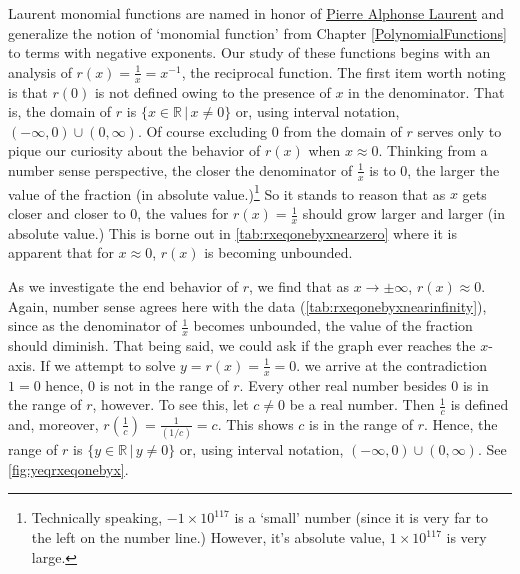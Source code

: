 Laurent monomial functions are named in honor of \href{https://en.wikipedia.org/wiki/Pierre_Alphonse_Laurent}{\underline{Pierre Alphonse Laurent}} and generalize the notion of `monomial function' from Chapter \ref{PolynomialFunctions} to terms with negative exponents. Our study of these functions begins with an analysis of   $r(x) = \frac{1}{x} = x^{-1}$, the reciprocal function. The first item worth  noting is that $r(0)$ is not defined owing to the presence of $x$  in the denominator.  That is, the domain of $r$ is $\{ x \in \mathbb{R} \, | \, x \neq 0\}$ or, using interval notation, $(-\infty, 0) \cup (0, \infty)$.   Of course excluding $0$ from the domain of $r$ serves only to pique our curiosity about the behavior of $r(x)$ when $x \approx 0$.  Thinking from a number sense perspective, the closer the denominator of $\frac{1}{x}$ is to $0$, the larger the value of the  fraction (in absolute value.)\footnote{Technically speaking, $-1 \times 10^{117}$ is a `small' number (since it is very far to the left on the number line.)  However, it's absolute value, $1 \times 10^{117}$ is very large.}  So it stands to reason that as $x$ gets closer and closer to $0$, the values for $r(x) = \frac{1}{x}$ should grow larger and larger (in absolute value.)  This is borne out in \autoref{tab:rxeqonebyxnearzero} where it is apparent that for $x \approx 0$, $r(x)$ is becoming unbounded.  

As we investigate the end behavior of $r$, we find that as $x \rightarrow \pm \infty$, $r(x) \approx 0$. Again, number sense agrees here with the data (\autoref{tab:rxeqonebyxnearinfinity}), since as the denominator of $\frac{1}{x}$ becomes unbounded, the value of the fraction should diminish.  That being said, we could ask if the graph ever reaches the $x$-axis.  If we attempt to solve $y = r(x) = \frac{1}{x} = 0$. we arrive at the contradiction $1 = 0$ hence, $0$ is not in the range of $r$.  Every other real number besides $0$ is in the range of $r$, however.  To see this, let $c \neq 0$ be a real number.  Then $\frac{1}{c}$ is defined and, moreover, $r \left(\frac{1}{c} \right) = \frac{1}{(1/c)} = c$.  This shows $c$ is in the range of $r$.  Hence, the range of $r$ is $\{ y \in \mathbb{R} \, | \, y \neq 0\}$ or, using interval notation,  $(-\infty, 0) \cup (0, \infty)$. See \autoref{fig:yeqrxeqonebyx}.

